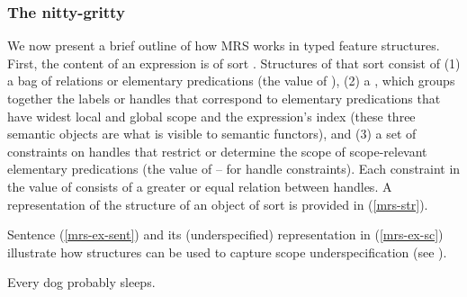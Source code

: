 \documentclass[output=paper,biblatex,babelshorthands,newtxmath,draftmode,colorlinks,citecolor=brown]{langscibook}
\begin{document}
\subsubsection{The nitty-gritty}

We now present a brief outline of how MRS works in typed feature structures. First, the content of an expression is of sort . Structures of that sort consist of (1) a bag of relations or elementary predications (the value of ), (2) a , which groups together the labels or handles that correspond to elementary predications that have widest local and global scope and the expression's index (these three semantic objects are what is visible to semantic functors), and (3) a set of constraints on handles that restrict or determine the scope of scope-relevant elementary predications (the value of  -- for handle constraints). Each constraint in the value of  consists of a greater or equal relation between handles. A representation of the structure of an object of sort   is provided in (\ref{mrs-str}).

\begin{exe}
\ex\label{mrs-str}
\end{exe}

Sentence (\ref{mrs-ex-sent}) and its (underspecified)  representation in (\ref{mrs-ex-sc}) illustrate how  structures can be used to capture scope underspecification (see \citealt[306]{Copestakeetal2005}). 

\begin{exe}
\ex\label{mrs-ex-sent}
Every dog probably sleeps.
\ex\label{mrs-ex-sc}
\end{exe}
\end{document}
